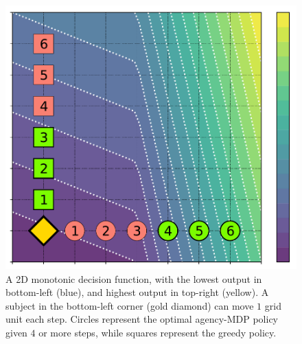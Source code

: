\begin{figure}
    \centering
{}
    \includegraphics[width=\linewidth]{figures/incentive_2d.pdf}
\endminipage\hfill
{}
    \caption{A 2D monotonic decision function, with the lowest output in bottom-left (blue), and highest output in top-right (yellow). A subject in the bottom-left corner (gold diamond) can move $1$ grid unit each step. Circles represent the optimal agency-MDP policy given $4$ or more steps, while squares represent the greedy policy.}
\endminipage
    \label{fig:2di}
\end{figure}


